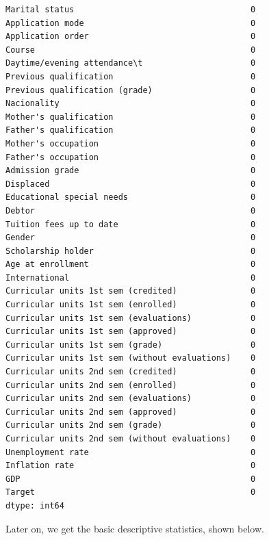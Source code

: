 \documentclass[
  letterpaper,
  DIV=11,
  numbers=noendperiod]{scrartcl}
\begin{document}
\begin{verbatim}
Marital status                                    0
Application mode                                  0
Application order                                 0
Course                                            0
Daytime/evening attendance\t                      0
Previous qualification                            0
Previous qualification (grade)                    0
Nacionality                                       0
Mother's qualification                            0
Father's qualification                            0
Mother's occupation                               0
Father's occupation                               0
Admission grade                                   0
Displaced                                         0
Educational special needs                         0
Debtor                                            0
Tuition fees up to date                           0
Gender                                            0
Scholarship holder                                0
Age at enrollment                                 0
International                                     0
Curricular units 1st sem (credited)               0
Curricular units 1st sem (enrolled)               0
Curricular units 1st sem (evaluations)            0
Curricular units 1st sem (approved)               0
Curricular units 1st sem (grade)                  0
Curricular units 1st sem (without evaluations)    0
Curricular units 2nd sem (credited)               0
Curricular units 2nd sem (enrolled)               0
Curricular units 2nd sem (evaluations)            0
Curricular units 2nd sem (approved)               0
Curricular units 2nd sem (grade)                  0
Curricular units 2nd sem (without evaluations)    0
Unemployment rate                                 0
Inflation rate                                    0
GDP                                               0
Target                                            0
dtype: int64
\end{verbatim}

Later on, we get the basic descriptive statistics, shown below.
\end{document}
